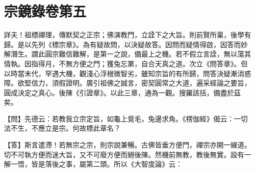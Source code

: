 
% 

\chapter{宗鏡錄卷第五}

詳夫！祖標禪理，傳默契之正宗；佛演教門，立詮下之大旨。則前賢所稟，後學有歸。是以先列《標宗章》。為有疑故問，以決疑故答。因問而疑情得啟，因答而妙解潛生。謂此圓宗難信難解，是第一之說，備最上之機。若不假立言詮，無以蕩其情執。因指得月，不無方便之門；獲兔忘罤，自合天真之道。次立《問答章》。但以時當末代，罕遇大機，觀淺心浮根微智劣，雖知宗旨的有所歸，問答決疑漸消惑障。欲堅信力，須假證明。廣引祖佛之誠言，密契圓常之大道，遍采經論之要旨，圓成決定之真心。後陳《引證章》。以此三章，通為一觀。搜羅該括，備盡於茲矣。 


{\heiti 【問】先德云：若教我立宗定旨，如龜上覓毛，兔邊求角。《楞伽經》偈云：一切法不生，不應立是宗。何故標此章名？}

【答】斯言遣滯！若無宗之宗，則宗說兼暢。古佛皆垂方便門，禪宗亦開一線道。切不可執方便而迷大旨，又不可廢方便而絕後陳。然機前無教，教後無實。設有一解一悟，皆是落後之事，屬第二頭。所以《大智度論》云：

